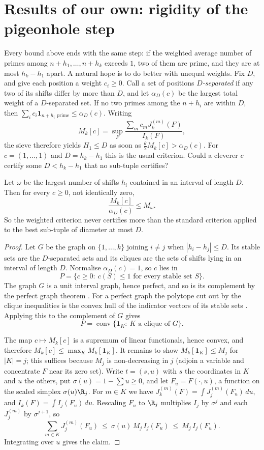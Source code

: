 \section{Results of our own: rigidity of the pigeonhole step}

Every bound above ends with the same step: if the weighted average number of
primes among $n+h_1,\dots,n+h_k$ exceeds $1$, two of them are prime, and they
are at most $h_k-h_1$ apart. A natural hope is to do better with unequal
weights. Fix $D$, and give each position a weight $c_i\ge0$. Call a set of
positions \emph{$D$-separated} if any two of its shifts differ by more than
$D$, and let $\alpha_D(c)$ be the largest total weight of a $D$-separated set.
If no two primes among the $n+h_i$ are within $D$, then
$\sum_ic_i\mathbf 1_{n+h_i\text{ prime}}\le\alpha_D(c)$. Writing
\[
M_k[c]=\sup_F\frac{\sum_{m}c_mJ_k^{(m)}(F)}{I_k(F)},
\]
the sieve therefore yields $H_1\le D$ as soon as
$\tfrac{\theta}{2}M_k[c]>\alpha_D(c)$. For $c=(1,\dots,1)$ and $D=h_k-h_1$
this is the usual criterion. Could a cleverer $c$ certify some $D<h_k-h_1$
that no sub-tuple certifies?

\begin{proposition}\label{prop:rigid}
Let $\omega$ be the largest number of shifts $h_i$ contained in an interval of
length $D$. Then for every $c\ge0$, not identically zero,
\[
\frac{M_k[c]}{\alpha_D(c)}\le M_\omega .
\]
So the weighted criterion never certifies more than the standard criterion
applied to the best sub-tuple of diameter at most $D$.
\end{proposition}

\begin{proof}
Let $G$ be the graph on $\{1,\dots,k\}$ joining $i\ne j$ when
$|h_i-h_j|\le D$. Its stable sets are the $D$-separated sets and its cliques
are the sets of shifts lying in an interval of length $D$. Normalise
$\alpha_D(c)=1$, so $c$ lies in
\[P=\{c\ge0:\ c(S)\le1\text{ for every stable set }S\}.\] The graph $G$ is a
unit interval graph, hence perfect, and so is its complement by the perfect
graph theorem \cite{Lov72}. For a perfect graph the polytope cut out by the
clique inequalities is the convex hull of the indicator vectors of its stable
sets \cite{Chv75}. Applying this to the complement of $G$ gives
\[P=\operatorname{conv}\{\mathbf 1_K:\ K\text{ a clique of }G\}.\]

The map $c\mapsto M_k[c]$ is a supremum of linear functionals, hence convex,
and therefore $M_k[c]\le\max_KM_k[\mathbf 1_K]$. It remains to show
$M_k[\mathbf 1_K]\le M_{j}$ for $|K|=j$; this suffices because $M_j$ is
non-decreasing in $j$ (adjoin a variable and concentrate $F$ near its zero
set). Write $t=(s,u)$ with $s$ the coordinates in $K$ and $u$ the others, put
$\sigma(u)=1-\sum u\ge0$, and let $F_u=F(\cdot,u)$, a function on the scaled
simplex $\sigma(u)\R_j$. For $m\in K$ we have
$J_k^{(m)}(F)=\int J_j^{(m)}(F_u)\,du$, and $I_k(F)=\int I_j(F_u)\,du$.
Rescaling $F_u$ to $\R_j$ multiplies $I_j$ by $\sigma^{j}$ and each
$J_j^{(m)}$ by $\sigma^{j+1}$, so
\[
\sum_{m\in K}J_j^{(m)}(F_u)\ \le\ \sigma(u)\,M_j\,I_j(F_u)\ \le\ M_j\,I_j(F_u).
\]
Integrating over $u$ gives the claim.
\end{proof}

